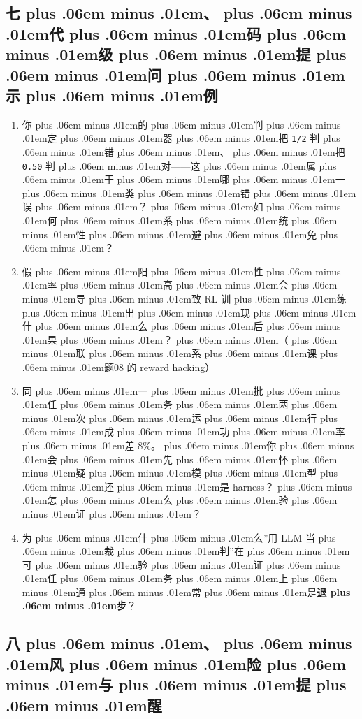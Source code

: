\documentclass[
]{article}
\newcommand{\passthrough}[1]{#1}
\providecommand{\tightlist}{%
  \setlength{\itemsep}{0pt}\setlength{\parskip}{0pt}}
\def\zh#1{{\zhfont #1}}
\def\zhglue{\hskip0pt plus .06em minus .01em}
\begin{document}
\subsection{\zh{七\zhglue 、\zhglue 代\zhglue 码\zhglue 级\zhglue 提\zhglue 问\zhglue 示\zhglue 例}}\label{ux4e03ux4ee3ux7801ux7ea7ux63d0ux95eeux793aux4f8b}

\begin{enumerate}
\def\labelenumi{\arabic{enumi}.}
\tightlist
\item
  \zh{你\zhglue 的\zhglue 判\zhglue 定\zhglue 器\zhglue 把} \passthrough{\lstinline!1/2!} \zh{判\zhglue 错\zhglue 、\zhglue 把} \passthrough{\lstinline!0.50!} \zh{判\zhglue 对}------\zh{这\zhglue 属\zhglue 于\zhglue 哪\zhglue 一\zhglue 类\zhglue 错\zhglue 误\zhglue ？\zhglue 如\zhglue 何\zhglue 系\zhglue 统\zhglue 性\zhglue 避\zhglue 免\zhglue ？}
\item
  \zh{假\zhglue 阳\zhglue 性\zhglue 率\zhglue 高\zhglue 会\zhglue 导\zhglue 致} RL \zh{训\zhglue 练\zhglue 出\zhglue 现\zhglue 什\zhglue 么\zhglue 后\zhglue 果\zhglue ？\zhglue （\zhglue 联\zhglue 系\zhglue 课\zhglue 题}08 \zh{的} reward hacking\zh{）}
\item
  \zh{同\zhglue 一\zhglue 批\zhglue 任\zhglue 务\zhglue 两\zhglue 次\zhglue 运\zhglue 行\zhglue 成\zhglue 功\zhglue 率\zhglue 差} 8\%\zh{。\zhglue 你\zhglue 会\zhglue 先\zhglue 怀\zhglue 疑\zhglue 模\zhglue 型\zhglue 还\zhglue 是} harness\zh{？\zhglue 怎\zhglue 么\zhglue 验\zhglue 证\zhglue ？}
\item
  \zh{为\zhglue 什\zhglue 么}''\zh{用} LLM \zh{当\zhglue 裁\zhglue 判}''\zh{在\zhglue 可\zhglue 验\zhglue 证\zhglue 任\zhglue 务\zhglue 上\zhglue 通\zhglue 常\zhglue 是}\textbf{\zh{退\zhglue 步}}\zh{？}
\end{enumerate}

\subsection{\zh{八\zhglue 、\zhglue 风\zhglue 险\zhglue 与\zhglue 提\zhglue 醒}}\label{ux516bux98ceux9669ux4e0eux63d0ux9192}
\end{document}
